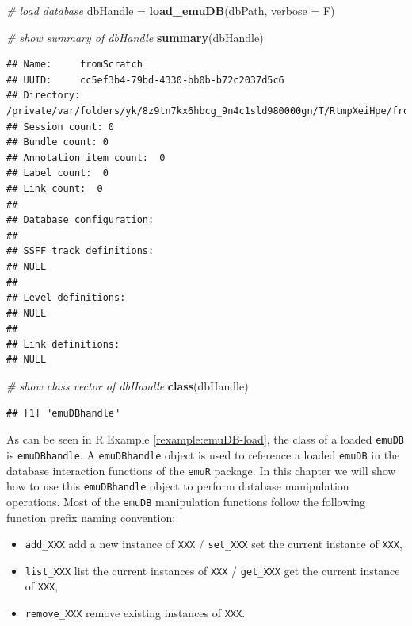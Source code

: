 \documentclass[]{book}
\newenvironment{Shaded}{\begin{snugshade}}{\end{snugshade}}
\newcommand{\CommentTok}[1]{\textcolor[rgb]{0.56,0.35,0.01}{\textit{#1}}}
\newcommand{\DataTypeTok}[1]{\textcolor[rgb]{0.13,0.29,0.53}{#1}}
\newcommand{\KeywordTok}[1]{\textcolor[rgb]{0.13,0.29,0.53}{\textbf{#1}}}
\newcommand{\NormalTok}[1]{#1}
\newcommand{\StringTok}[1]{\textcolor[rgb]{0.31,0.60,0.02}{#1}}
\providecommand{\tightlist}{%
  \setlength{\itemsep}{0pt}\setlength{\parskip}{0pt}}
\theoremstyle{definition}
\theoremstyle{definition}
\theoremstyle{definition}
\theoremstyle{remark}
\begin{document}
\begin{Shaded}
\begin{Highlighting}[]
\CommentTok{# load database}
\NormalTok{dbHandle =}\StringTok{ }\KeywordTok{load_emuDB}\NormalTok{(dbPath, }\DataTypeTok{verbose =}\NormalTok{ F)}

\CommentTok{# show summary of dbHandle}
\KeywordTok{summary}\NormalTok{(dbHandle)}
\end{Highlighting}
\end{Shaded}

\begin{verbatim}
## Name:     fromScratch 
## UUID:     cc5ef3b4-79bd-4330-bb0b-b72c2037d5c6 
## Directory:    /private/var/folders/yk/8z9tn7kx6hbcg_9n4c1sld980000gn/T/RtmpXeiHpe/fromScratch_emuDB 
## Session count: 0 
## Bundle count: 0 
## Annotation item count:  0 
## Label count:  0 
## Link count:  0 
## 
## Database configuration:
## 
## SSFF track definitions:
## NULL
## 
## Level definitions:
## NULL
## 
## Link definitions:
## NULL
\end{verbatim}

\begin{Shaded}
\begin{Highlighting}[]
\CommentTok{# show class vector of dbHandle}
\KeywordTok{class}\NormalTok{(dbHandle)}
\end{Highlighting}
\end{Shaded}

\begin{verbatim}
## [1] "emuDBhandle"
\end{verbatim}

As can be seen in R Example \ref{rexample:emuDB-load}, the class of a
loaded \texttt{emuDB} is \texttt{emuDBhandle}. A \texttt{emuDBhandle}
object is used to reference a loaded \texttt{emuDB} in the database
interaction functions of the \texttt{emuR} package. In this chapter we
will show how to use this \texttt{emuDBhandle} object to perform
database manipulation operations. Most of the \texttt{emuDB}
manipulation functions follow the following function prefix naming
convention:

\begin{itemize}
\tightlist
\item
  \texttt{add\_XXX} add a new instance of \texttt{XXX} /
  \texttt{set\_XXX} set the current instance of \texttt{XXX},
\item
  \texttt{list\_XXX} list the current instances of \texttt{XXX} /
  \texttt{get\_XXX} get the current instance of \texttt{XXX},
\item
  \texttt{remove\_XXX} remove existing instances of \texttt{XXX}.
\end{itemize}
\end{document}
